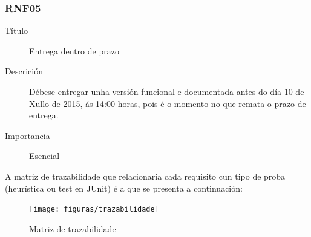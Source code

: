 \subsubsection*{RNF05}
\begin{description}
\item[Título] \hfill
Entrega dentro de prazo
\item[Descrición] \hfill
Débese entregar unha versión funcional e documentada antes do día 10 de Xullo de 2015, ás 14:00 horas, pois é o momento no que remata o prazo de entrega.
\item[Importancia] \hfill
Esencial
\end{description}

A matriz de trazabilidade que relacionaría cada requisito cun tipo de proba (heurística ou test en JUnit) é a que se presenta a continuación:

\begin{figure}
\texttt{[image: figuras/trazabilidade]}
\caption{Matriz de trazabilidade}
\label{trazabilidade}
\end{figure}
